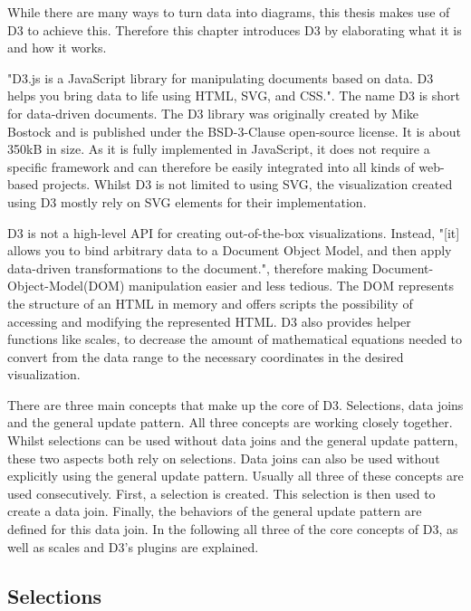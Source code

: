 While there are many ways to turn data into diagrams, this thesis makes use of D3 to achieve this. Therefore this chapter introduces D3 by elaborating what it is and how it works.

"D3.js is a JavaScript library for manipulating documents based on data. D3 helps you bring data to life using HTML, SVG, and CSS."\cite{d3js}. The name D3 is short for data-driven documents. The D3 library was originally created by Mike Bostock and is published under the BSD-3-Clause open-source license. It is about 350kB in size. As it is fully implemented in JavaScript, it does not require a specific framework and can therefore be easily integrated into all kinds of web-based projects. Whilst D3 is not limited to using SVG, the visualization created using D3 mostly rely on SVG elements for their implementation.

D3 is not a high-level API for creating out-of-the-box visualizations. Instead, "[it] allows you to bind arbitrary data to a Document Object Model, and then apply data-driven transformations to the document."\cite{d3js}, therefore making Document-Object-Model(DOM) manipulation easier and less tedious. The DOM represents the structure of an HTML in memory and offers scripts the possibility of accessing and modifying the represented HTML. D3 also provides helper functions like scales, to decrease the amount of mathematical equations needed to convert from the data range to the necessary coordinates in the desired visualization.

There are three main concepts that make up the core of D3. Selections, data joins and the general update pattern. All three concepts are working closely together. Whilst selections can be used without data joins and the general update pattern, these two aspects both rely on selections. Data joins can also be used without explicitly using the general update pattern. Usually all three of these concepts are used consecutively. First, a selection is created. This selection is then used to create a data join. Finally, the behaviors of the general update pattern are defined for this data join.
In the following all three of the core concepts of D3, as well as scales and D3's plugins are explained.


\subsection{Selections}

